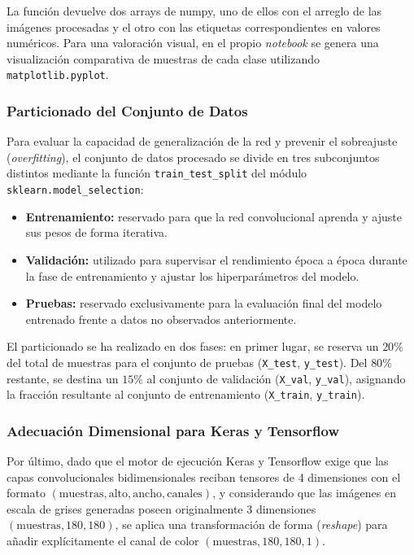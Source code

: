 \documentclass[11pt, a4paper]{article}
\numberwithin{equation}{section}
\begin{document}
La función devuelve dos arrays de numpy, uno de ellos con el arreglo de las imágenes procesadas y el otro con las etiquetas correspondientes en valores numéricos. Para una valoración visual, en el propio \textit{notebook} se genera una visualización comparativa de muestras de cada clase utilizando \texttt{matplotlib.pyplot}.

\subsubsection{Particionado del Conjunto de Datos}

Para evaluar la capacidad de generalización de la red y prevenir el sobreajuste (\textit{overfitting}), el conjunto de datos procesado se divide en tres subconjuntos distintos mediante la función \texttt{train\_test\_split} del módulo \texttt{sklearn.model\_selection}:

\begin{itemize}
\item \textbf{Entrenamiento:} reservado para que la red convolucional aprenda y ajuste sus pesos de forma iterativa.

\item \textbf{Validación:} utilizado para supervisar el rendimiento época a época durante la fase de entrenamiento y ajustar los hiperparámetros del modelo.

\item \textbf{Pruebas:} reservado exclusivamente para la evaluación final del modelo entrenado frente a datos no observados anteriormente.
\end{itemize}

El particionado se ha realizado en dos fases: en primer lugar, se reserva un $20\%$ del total de muestras para el conjunto de pruebas (\texttt{X\_test}, \texttt{y\_test}). Del $80\%$ restante, se destina un $15\%$ al conjunto de validación (\texttt{X\_val}, \texttt{y\_val}), asignando la fracción resultante al conjunto de entrenamiento (\texttt{X\_train}, \texttt{y\_train}).

\subsubsection{Adecuación Dimensional para Keras y Tensorflow}

Por último, dado que el motor de ejecución Keras y Tensorflow exige que las capas convolucionales bidimensionales reciban tensores de 4 dimensiones con el formato $(\text{muestras}, \text{alto}, \text{ancho}, \text{canales})$, y considerando que las imágenes en escala de grises generadas poseen originalmente 3 dimensiones $(\text{muestras}, 180, 180)$, se aplica una transformación de forma (\textit{reshape}) para añadir explícitamente el canal de color $(\text{muestras}, 180, 180, 1)$.
\end{document}
